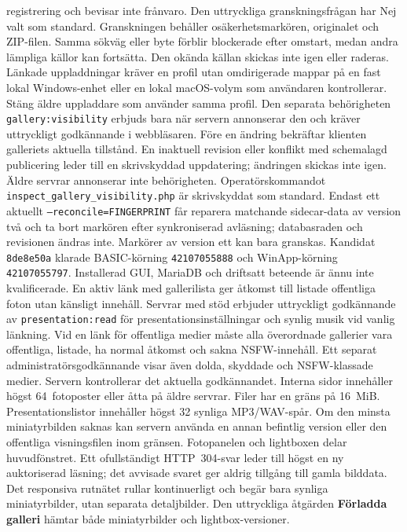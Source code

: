 \documentclass[11pt,a4paper]{article}
\newcommand{\ui}[1]{\textbf{#1}}
\begin{document}
registrering och bevisar inte frånvaro. Den uttryckliga granskningsfrågan har
Nej valt som standard. Granskningen behåller osäkerhetsmarkören, originalet och
ZIP-filen. Samma sökväg eller byte förblir blockerade efter omstart, medan andra
lämpliga källor kan fortsätta. Den okända källan skickas inte igen eller raderas.
Länkade uppladdningar kräver en profil utan omdirigerade mappar på en fast
lokal Windows-enhet eller en lokal macOS-volym som användaren kontrollerar.
Stäng äldre uppladdare som använder samma profil.
Den separata behörigheten \texttt{gallery:visibility} erbjuds bara när servern
annonserar den och kräver uttryckligt godkännande i webbläsaren. Före en ändring
bekräftar klienten galleriets aktuella tillstånd. En inaktuell revision eller
konflikt med schemalagd publicering leder till en skrivskyddad uppdatering;
ändringen skickas inte igen. Äldre servrar annonserar inte behörigheten.
Operatörskommandot
\texttt{inspect\_gallery\_visibility.php} är skrivskyddat som standard.
Endast ett aktuellt \texttt{--reconcile=FINGERPRINT} får reparera matchande
sidecar-data av version två och ta bort markören efter synkroniserad avläsning;
databasraden och revisionen ändras inte. Markörer av version ett kan bara
granskas. Kandidat \texttt{8de8e50a} klarade BASIC-körning
\texttt{42107055888} och WinApp-körning \texttt{42107055797}. Installerad GUI,
MariaDB och driftsatt beteende är ännu inte kvalificerade.
En aktiv länk med gallerilista ger åtkomst till listade offentliga foton
utan känsligt innehåll. Servrar med stöd erbjuder uttryckligt godkännande
av \texttt{presentation:read} för presentationsinställningar och synlig musik
vid vanlig länkning. Vid en länk för offentliga medier måste alla överordnade
gallerier vara offentliga, listade, ha normal åtkomst och sakna NSFW-innehåll.
Ett separat administratörsgodkännande visar även dolda, skyddade och
NSFW-klassade medier. Servern kontrollerar det aktuella godkännandet.
Interna sidor innehåller högst 64~fotoposter eller åtta på äldre servrar.
Filer har en gräns på 16~MiB.
Presentationslistor innehåller högst 32 synliga MP3/WAV-spår. Om den minsta
miniatyrbilden saknas kan servern använda en annan befintlig version eller
den offentliga visningsfilen inom gränsen. Fotopanelen och lightboxen delar
huvudfönstret.
Ett ofullständigt HTTP~304-svar leder till högst en ny auktoriserad läsning;
det avvisade svaret ger aldrig tillgång till gamla bilddata.
Det responsiva rutnätet rullar kontinuerligt och begär bara synliga miniatyrbilder,
utan separata detaljbilder. Den uttryckliga åtgärden \ui{Förladda galleri}
hämtar både miniatyrbilder och lightbox-versioner.
\end{document}
